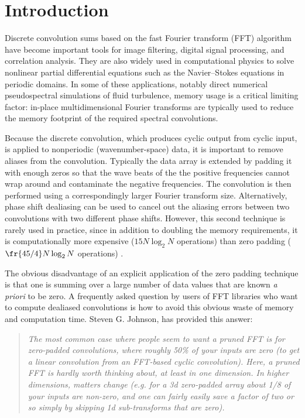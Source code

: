 \documentclass[final]{siamltex}
\begin{document}

\section{Introduction}
Discrete convolution sums based on the fast Fourier transform (FFT) algorithm
have become important tools for image filtering, digital signal processing, and
correlation analysis. They are also widely used in computational physics to
solve nonlinear partial differential equations such as the Navier--Stokes
equations in periodic domains. In some of these applications, notably
direct numerical pseudospectral simulations of fluid turbulence, memory
usage is a critical limiting factor: in-place multidimensional Fourier
transforms are typically used to reduce the memory footprint of
the required spectral convolutions.

Because the discrete convolution, which produces cyclic output from cyclic
input, is applied to nonperiodic (wavenumber-space) data, it is important
to remove aliases from the convolution. Typically the data array is
extended by padding it with enough zeros so that the wave beats of the
the positive frequencies cannot wrap around and contaminate
the negative frequencies. The convolution is then performed using a
correspondingly larger Fourier transform size. Alternatively, phase
shift dealiasing \cite{Patterson71,Canuto} can be used to cancel out the
aliasing errors between two convolutions with two different phase
shifts. However, this second technique is rarely used in practice, since in
addition to doubling the memory requirements, it is computationally more
expensive ($15N\log_2 N$ operations) than zero padding
($\fr{45/4}N\log_2 N$ operations) \cite[p.~136]{Canuto}. 

The obvious disadvantage of an explicit application of the zero padding
technique is that one is summing over a large number of data values that
are known {\it a priori\/} to be zero.
A frequently asked question by users of FFT libraries
who want to compute dealiased convolutions is how to avoid this obvious
waste of memory and computation time.
Steven G. Johnson, has provided this
answer\cite{http://www.fftw.org/pruned.html}:
\begin{quotation}
{\it
The most common case where people seem to want a pruned FFT is for
zero-padded convolutions, where roughly 50\% of your inputs are zero (to
get a linear convolution from an FFT-based cyclic convolution). Here, a
pruned FFT is hardly worth thinking about, at least in one dimension. In
higher dimensions, matters change (e.g. for a 3d zero-padded array about
1/8 of your inputs are non-zero, and one can fairly easily save a factor of
two or so simply by skipping 1d sub-transforms that are zero).
}
\end{quotation}
\end{document}
